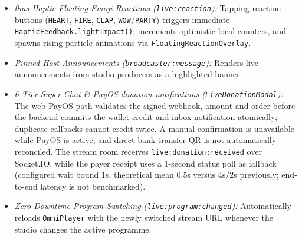 {\begin{enumerate}[leftmargin=*,itemsep=2pt]
\begin{itemize}[leftmargin=*,itemsep=1pt]
    \item \emph{0ms Haptic Floating Emoji Reactions (\texttt{live:reaction}):} Tapping reaction buttons (\texttt{HEART}, \texttt{FIRE}, \texttt{CLAP}, \texttt{WOW}/\texttt{PARTY}) triggers immediate \texttt{HapticFeedback.lightImpact()}, increments optimistic local counters, and spawns rising particle animations via \texttt{FloatingReactionOverlay}.
    \item \emph{Pinned Host Announcements (\texttt{broadcaster:message}):} Renders live announcements from studio producers as a highlighted banner.
    \item \emph{6-Tier Super Chat \& PayOS donation notifications (\texttt{LiveDonationModal}):} The web PayOS path validates the signed webhook, amount and order before the backend commits the wallet credit and inbox notification atomically; duplicate callbacks cannot credit twice. A manual confirmation is unavailable while PayOS is active, and direct bank-transfer QR is not automatically reconciled. The stream room receives \texttt{live:donation:received} over Socket.IO, while the payer receipt uses a 1-second status poll as fallback (configured wait bound 1s, theoretical mean 0.5s versus 4s/2s previously; end-to-end latency is not benchmarked).
    \item \emph{Zero-Downtime Program Switching (\texttt{live:program:changed}):} Automatically reloads \texttt{OmniPlayer} with the newly switched stream URL whenever the studio changes the active programme.
  \end{itemize}
\end{enumerate}
}

\begin{figure}[t]
\centering
\fitcol{\figDonationNotificationFlow}
\caption{}
\label{fig:mobile_donation_notification}
\end{figure}

\subsection{}

